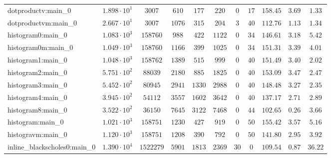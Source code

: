\begin{tabular}{|l|c|c|c|c|c|c|c|c|c|c|}
dotproductv:main\_0            & $ 1.898 \cdot 10^{1} $ & $ 3007     $ & $ 610    $ & $ 177    $ & $ 220    $ & $ 0    $ & $ 17   $ & $ 158.45      $ & $ 3.69    $ & $ 1.33    $ \\
dotproductvm:main\_0           & $ 2.667 \cdot 10^{1} $ & $ 3007     $ & $ 1076   $ & $ 315    $ & $ 204    $ & $ 3    $ & $ 40   $ & $ 112.76      $ & $ 1.13    $ & $ 1.34    $ \\
histogram0:main\_0             & $ 1.083 \cdot 10^{3} $ & $ 158760   $ & $ 988    $ & $ 422    $ & $ 1122   $ & $ 0    $ & $ 34   $ & $ 146.61      $ & $ 3.18    $ & $ 5.42    $ \\
histogram0m:main\_0            & $ 1.049 \cdot 10^{3} $ & $ 158760   $ & $ 1166   $ & $ 399    $ & $ 1025   $ & $ 0    $ & $ 34   $ & $ 151.31      $ & $ 3.39    $ & $ 4.01    $ \\
histogram1:main\_0             & $ 1.048 \cdot 10^{3} $ & $ 158762   $ & $ 1389   $ & $ 515    $ & $ 999    $ & $ 0    $ & $ 40   $ & $ 151.49      $ & $ 3.40    $ & $ 2.02    $ \\
histogram2:main\_0             & $ 5.751 \cdot 10^{2} $ & $ 88039    $ & $ 2180   $ & $ 885    $ & $ 1825   $ & $ 0    $ & $ 40   $ & $ 153.09      $ & $ 3.47    $ & $ 2.47    $ \\
histogram3:main\_0             & $ 5.452 \cdot 10^{2} $ & $ 80945    $ & $ 2941   $ & $ 1330   $ & $ 2988   $ & $ 0    $ & $ 40   $ & $ 148.48      $ & $ 3.27    $ & $ 2.35    $ \\
histogram4:main\_0             & $ 3.945 \cdot 10^{2} $ & $ 54112    $ & $ 3557   $ & $ 1602   $ & $ 3642   $ & $ 0    $ & $ 40   $ & $ 137.17      $ & $ 2.71    $ & $ 2.89    $ \\
histogram8:main\_0             & $ 3.522 \cdot 10^{2} $ & $ 36150    $ & $ 7645   $ & $ 3122   $ & $ 7468   $ & $ 0    $ & $ 44   $ & $ 102.65      $ & $ 0.26    $ & $ 3.66    $ \\
histogram:main\_0              & $ 1.021 \cdot 10^{3} $ & $ 158751   $ & $ 1230   $ & $ 427    $ & $ 919    $ & $ 0    $ & $ 50   $ & $ 155.42      $ & $ 3.57    $ & $ 5.16    $ \\
histogravm:main\_0             & $ 1.120 \cdot 10^{3} $ & $ 158751   $ & $ 1208   $ & $ 390    $ & $ 792    $ & $ 0    $ & $ 50   $ & $ 141.80      $ & $ 2.95    $ & $ 3.92    $ \\
inline\_blackscholes0:main\_0  & $ 1.390 \cdot 10^{4} $ & $ 1522279  $ & $ 5901   $ & $ 1813   $ & $ 2369   $ & $ 30   $ & $ 0    $ & $ 109.54      $ & $ 0.87    $ & $ 36.22   $ \\

\end{tabular}
